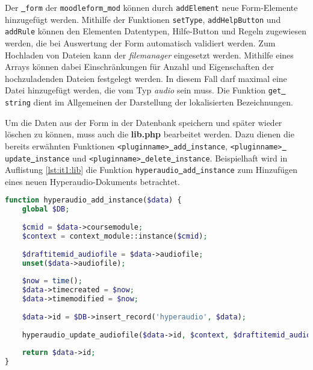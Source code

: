 Der \texttt{\underline{{ }}form} der \texttt{moodleform\underline{{ }}mod} können durch \texttt{addElement} neue Form-Elemente hinzugefügt werden. Mithilfe der Funktionen \texttt{setType}, \texttt{addHelpButton} und \texttt{addRule} können den Elementen Datentypen, Hilfe-Button und Regeln zugewiesen werden, die bei Auswertung der Form automatisch validiert werden. Zum Hochladen von Dateien kann der \textit{filemanager} eingesetzt werden. Mithilfe eines Arrays können dabei Einschränkungen für Anzahl und Eigenschaften der hochzuladenden Dateien festgelegt werden. In diesem Fall darf maximal eine Datei hinzugefügt werden, die vom Typ \textit{audio} sein muss. Die Funktion \texttt{get\underline{{ }}string} dient im Allgemeinen der Darstellung der lokalisierten Bezeichnungen.

Um die Daten aus der Form in der Datenbank speichern und später wieder löschen zu können, muss auch die \textbf{lib.php} bearbeitet werden. Dazu dienen die bereits erwähnten Funktionen \texttt{<pluginname>\underline{{ }}add\underline{{ }}instance}, \texttt{<pluginname>\underline{{ }}update\underline{{ }}instance} und \texttt{<pluginname>\underline{{ }}delete\underline{{ }}instance}. Beispielhaft wird in Auflistung \ref{lst:it1:lib} die Funktion \texttt{hyperaudio\underline{{ }}add\underline{{ }}instance} zum Hinzufügen eines neuen Hyperaudio-Dokuments betrachtet. 

\begin{lstlisting}[language=php,
             linewidth=\textwidth,
             caption={Ausschnitt der \textbf{lib.php} in der 1. Iteration},
             label={lst:it1:lib}]
function hyperaudio_add_instance($data) {
    global $DB;
    
    $cmid = $data->coursemodule;
    $context = context_module::instance($cmid);
    
    $draftitemid_audiofile = $data->audiofile;
    unset($data->audiofile);
     
    $now = time();
    $data->timecreated = $now;
    $data->timemodified = $now;
    
    $data->id = $DB->insert_record('hyperaudio', $data);
    
    hyperaudio_update_audiofile($data->id, $context, $draftitemid_audiofile);
     
    return $data->id;
}
\end{lstlisting}

